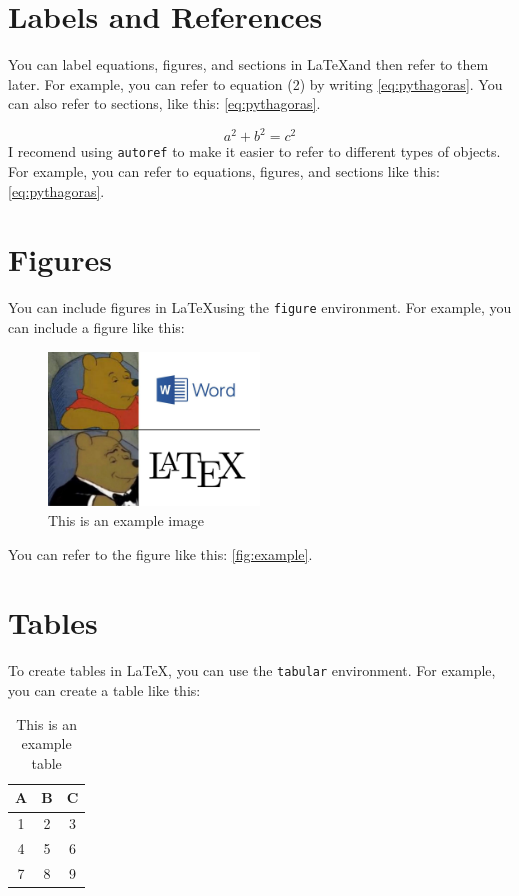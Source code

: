 \documentclass{article}
\begin{document}
\section{Labels and References}
You can label equations, figures, and sections in \LaTeX and then refer to them later. For example, you can refer to equation (2) by writing \eqref{eq:pythagoras}. You can also refer to sections, like this: \ref{eq:pythagoras}.

\begin{equation}\label{eq:pythagoras}   
a^2 + b^2 = c^2 
\end{equation}
I recomend using \texttt{autoref} to make it easier to refer to different types of objects. For example, you can refer to equations, figures, and sections like this: \autoref{eq:pythagoras}. 
\section{Figures}

You can include figures in \LaTeX using the \texttt{figure} environment. For example, you can include a figure like this:

\begin{figure}[ht]
    \centering
    \includegraphics[width=0.5\textwidth]{Image.jpg}
    \caption{This is an example image}
    \label{fig:example}
\end{figure}

You can refer to the figure like this: \autoref{fig:example}.

\section{Tables}
To create tables in \LaTeX, you can use the \texttt{tabular} environment. For example, you can create a table like this:

\begin{table}[ht]
    \centering
    \begin{tabular}{|c|c|c|}
        \hline
        A & B & C \\
        \hline
        1 & 2 & 3 \\
        4 & 5 & 6 \\
        7 & 8 & 9 \\
        \hline
    \end{tabular}
    \caption{This is an example table}
    \label{tab:example}
\end{table}
\end{document}
